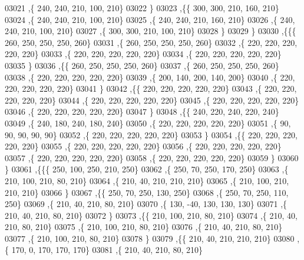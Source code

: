 \begin{DoxyCode}
03021     ,\{   240,   240,   210,   100,   210\}
03022     \}
03023    ,\{\{   300,   300,   210,   160,   210\}
03024     ,\{   240,   240,   210,   100,   210\}
03025     ,\{   240,   240,   210,   160,   210\}
03026     ,\{   240,   240,   210,   100,   210\}
03027     ,\{   300,   300,   210,   100,   210\}
03028     \}
03029    \}
03030   ,\{\{\{   260,   250,   250,   250,   260\}
03031     ,\{   260,   250,   250,   250,   260\}
03032     ,\{   220,   220,   220,   220,   220\}
03033     ,\{   220,   220,   220,   220,   220\}
03034     ,\{   220,   220,   220,   220,   220\}
03035     \}
03036    ,\{\{   260,   250,   250,   250,   260\}
03037     ,\{   260,   250,   250,   250,   260\}
03038     ,\{   220,   220,   220,   220,   220\}
03039     ,\{   200,   140,   200,   140,   200\}
03040     ,\{   220,   220,   220,   220,   220\}
03041     \}
03042    ,\{\{   220,   220,   220,   220,   220\}
03043     ,\{   220,   220,   220,   220,   220\}
03044     ,\{   220,   220,   220,   220,   220\}
03045     ,\{   220,   220,   220,   220,   220\}
03046     ,\{   220,   220,   220,   220,   220\}
03047     \}
03048    ,\{\{   240,   220,   240,   220,   240\}
03049     ,\{   240,   180,   240,   180,   240\}
03050     ,\{   220,   220,   220,   220,   220\}
03051     ,\{    90,    90,    90,    90,    90\}
03052     ,\{   220,   220,   220,   220,   220\}
03053     \}
03054    ,\{\{   220,   220,   220,   220,   220\}
03055     ,\{   220,   220,   220,   220,   220\}
03056     ,\{   220,   220,   220,   220,   220\}
03057     ,\{   220,   220,   220,   220,   220\}
03058     ,\{   220,   220,   220,   220,   220\}
03059     \}
03060    \}
03061   ,\{\{\{   250,   100,   250,   210,   250\}
03062     ,\{   250,    70,   250,   170,   250\}
03063     ,\{   210,   100,   210,    80,   210\}
03064     ,\{   210,    40,   210,   210,   210\}
03065     ,\{   210,   100,   210,   210,   210\}
03066     \}
03067    ,\{\{   250,    70,   250,   130,   250\}
03068     ,\{   250,    70,   250,   110,   250\}
03069     ,\{   210,    40,   210,    80,   210\}
03070     ,\{   130,   -40,   130,   130,   130\}
03071     ,\{   210,    40,   210,    80,   210\}
03072     \}
03073    ,\{\{   210,   100,   210,    80,   210\}
03074     ,\{   210,    40,   210,    80,   210\}
03075     ,\{   210,   100,   210,    80,   210\}
03076     ,\{   210,    40,   210,    80,   210\}
03077     ,\{   210,   100,   210,    80,   210\}
03078     \}
03079    ,\{\{   210,    40,   210,   210,   210\}
03080     ,\{   170,     0,   170,   170,   170\}
03081     ,\{   210,    40,   210,    80,   210\}

\end{DoxyCode}
